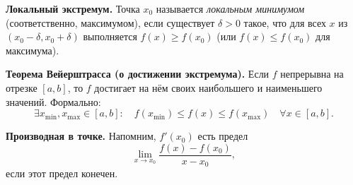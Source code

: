 
\textbf{Локальный экстремум.}
Точка $x_0$ называется \emph{локальным минимумом} (соответственно, максимумом), если существует $\delta>0$ такое, что для всех $x$ из $(x_0-\delta, x_0+\delta)$ выполняется $f(x)\ge f(x_0)$ (или $f(x)\le f(x_0)$ для максимума).

\medskip

\textbf{Теорема Вейерштрасса (о достижении экстремума).}
Если $f$ непрерывна на отрезке $[a,b]$, то $f$ достигает на нём своих наибольшего и наименьшего значений. Формально:
\[
\exists x_{\min}, x_{\max}\in[a,b]:\quad
f(x_{\min}) \le f(x) \le f(x_{\max})
\quad
\forall x \in [a,b].
\]

\textbf{Производная в точке.}
Напомним, $f'(x_0)$ есть предел
\[
\lim_{x\to x_0}\frac{f(x)-f(x_0)}{x - x_0},
\]
если этот предел конечен.
